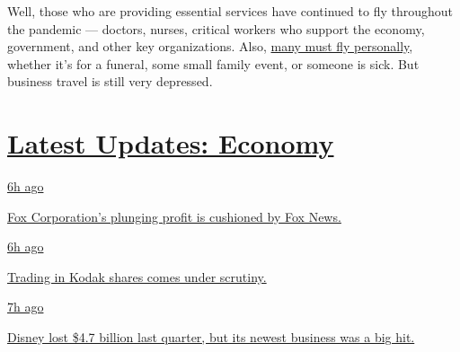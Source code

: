 Well, those who are providing essential services have continued to fly
throughout the pandemic --- doctors, nurses, critical workers who
support the economy, government, and other key organizations. Also,
\href{https://www.nytimes.com/2020/06/09/business/flying-coronovirus.html}{many
must fly personally}, whether it's for a funeral, some small family
event, or someone is sick. But business travel is still very depressed.

\hypertarget{latest-updates-economy}{%
\section{\texorpdfstring{\href{https://www.nytimes.com/live/2020/08/04/business/stock-market-today-coronavirus?action=click\&pgtype=Article\&state=default\&region=MAIN_CONTENT_1\&context=storylines_live_updates}{Latest
Updates:
Economy}}{Latest Updates: Economy}}\label{latest-updates-economy}}

\href{https://www.nytimes.com/live/2020/08/04/business/stock-market-today-coronavirus?action=click\&pgtype=Article\&state=default\&region=MAIN_CONTENT_1\&context=storylines_live_updates\#fox-corporations-plunging-profit-is-cushioned-by-fox-news}{6h
ago}

\href{https://www.nytimes.com/live/2020/08/04/business/stock-market-today-coronavirus?action=click\&pgtype=Article\&state=default\&region=MAIN_CONTENT_1\&context=storylines_live_updates\#fox-corporations-plunging-profit-is-cushioned-by-fox-news}{Fox
Corporation's plunging profit is cushioned by Fox News.}

\href{https://www.nytimes.com/live/2020/08/04/business/stock-market-today-coronavirus?action=click\&pgtype=Article\&state=default\&region=MAIN_CONTENT_1\&context=storylines_live_updates\#trading-in-kodak-shares-comes-under-scrutiny}{6h
ago}

\href{https://www.nytimes.com/live/2020/08/04/business/stock-market-today-coronavirus?action=click\&pgtype=Article\&state=default\&region=MAIN_CONTENT_1\&context=storylines_live_updates\#trading-in-kodak-shares-comes-under-scrutiny}{Trading
in Kodak shares comes under scrutiny.}

\href{https://www.nytimes.com/live/2020/08/04/business/stock-market-today-coronavirus?action=click\&pgtype=Article\&state=default\&region=MAIN_CONTENT_1\&context=storylines_live_updates\#disney-lost-4-7-billion-last-quarter-but-its-newest-business-was-a-big-hit}{7h
ago}

\href{https://www.nytimes.com/live/2020/08/04/business/stock-market-today-coronavirus?action=click\&pgtype=Article\&state=default\&region=MAIN_CONTENT_1\&context=storylines_live_updates\#disney-lost-4-7-billion-last-quarter-but-its-newest-business-was-a-big-hit}{Disney
lost \$4.7 billion last quarter, but its newest business was a big hit.}

